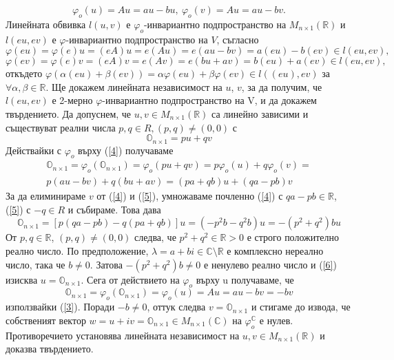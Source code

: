 \documentclass{article}
\begin{document}
\begin{equation}\label{3}
    \varphi_o(u)=Au=au-bu,\
    \varphi_o(v)=Au=au-bv.
\end{equation}
Линейната обвивка $l(u, v)$ е $\varphi_o$-инвариантно подпространство на $M_{n\times 1}(\mathbb{R})$
и $l(eu, ev)$ е $\varphi$-инвариантно подпространство на $V$, съгласно
\[
    \varphi(eu) = \varphi(e)u = (eA)u = e(Au) = e(au - bv) = a(eu) - b(ev) \in l(eu, ev),
\]
\[
    \varphi(ev) = \varphi(e)v = (eA)v = e(Av) = e(bu + av) = b(eu) + a(ev) \in l(eu, ev),
\]
откъдето $\varphi(\alpha(eu) + \beta(ev)) = \alpha\varphi(eu) + \beta\varphi(ev) \in l((eu), ev)$
за $\forall\alpha, \beta \in \mathbb{R}$. Ще докажем линейната независимост на $u$, $v$,
за да получим, че $l(eu, ev)$ е 2-мерно $\varphi$-инвариантно подпространство на V, и да докажем
твърдението. Да допуснем, че $u, v \in M_{n\times 1}(\mathbb{R})$ са линейно зависими и
съществуват реални числа $p, q \in R, (p, q) \neq (0, 0)$ с
\begin{equation*}\label{4}
    \mathbb{O}_{n\times 1}=pu+qv
\end{equation*}
Действайки с $\varphi_o$ върху (\ref*{4}) получаваме
\begin{gather*}\label{5}
    \mathbb{O}_{n\times 1}=\varphi_o(\mathbb{O}_{n\times 1})=\varphi_o(pu+qv)=
    p\varphi_o(u)+q\varphi_o(v)= \\
    p(au-bv)+q(bu+av)=(pa+qb)u+(qa-pb)v
\end{gather*}
За да елиминираме $v$ от (\ref*{4}) и (\ref*{5}), умножаваме почленно (\ref*{4}) с $qa-pb \in \mathbb{R}$,
(\ref*{5}) с $-q \in R$ и събираме. Това дава
\begin{equation*}\label{6}
    \mathbb{O}_{n\times 1} = [p(qa - pb) - q(pa + qb)]u = (-p^2b-q^2b)u=-(p^2+q^2)bu
\end{equation*}
От $p, q \in \mathbb{R}$, $(p, q) \neq (0, 0)$ следва, че $p^2 +q^2 \in \mathbb{R}>0$
е строго положително реално число. По предположение, $\lambda = a + bi \in \mathbb{C} \setminus \mathbb{R}$
е комплексно нереално число, така че $b \neq 0$. Затова $-(p^2 + q^2)b \neq 0$ е ненулево
реално число и (\ref*{6}) изисква $u = \mathbb{O}_{n\times 1}$. Сега от действието на $\varphi_o$
върху u получаваме, че
\[
    \mathbb{O}_{n\times 1} = \varphi_o(\mathbb{O}_{n\times 1}) = \varphi_o(u)=Au=au-bv=-bv
\]
използвайки (\ref*{3}). Поради $-b \neq 0$, оттук следва $v = \mathbb{O}_{n\times 1}$ и
стигаме до извода, че собственият вектор $w = u + iv = \mathbb{O}_{n\times 1} \in M_{n\times 1}(\mathbb{C})$
на $\varphi_o^\mathbb{C}$ е нулев. Противоречието установява линейната независимост на
$u, v \in M_{n\times 1}(\mathbb{R})$ и доказва твърдението.
\end{document}
